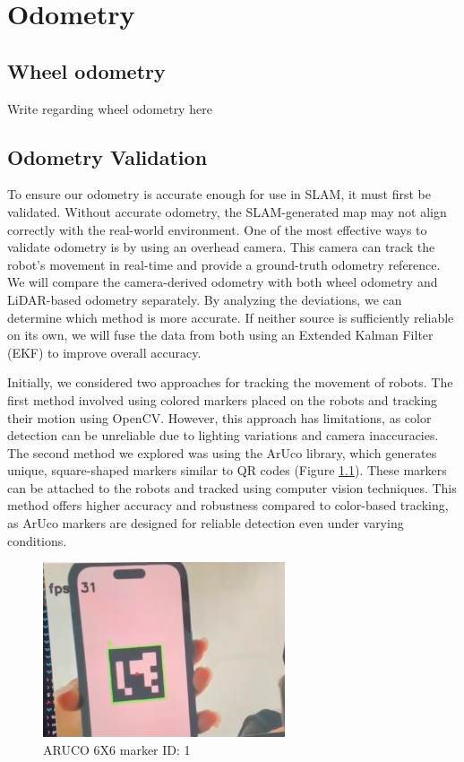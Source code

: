 \chapter{Odometry}

\section*{Wheel odometry}
{Write regarding wheel odometry here}

\section*{Odometry Validation}
To ensure our odometry is accurate enough for use in SLAM, it must first be validated. Without accurate odometry, the SLAM-generated map may not align correctly with the real-world environment. One of the most effective ways to validate odometry is by using an overhead camera. This camera can track the robot’s movement in real-time and provide a ground-truth odometry reference. We will compare the camera-derived odometry with both wheel odometry and LiDAR-based odometry separately. By analyzing the deviations, we can determine which method is more accurate. If neither source is sufficiently reliable on its own, we will fuse the data from both using an Extended Kalman Filter (EKF) to improve overall accuracy.
\newline

Initially, we considered two approaches for tracking the movement of robots. The first method involved using colored markers placed on the robots and tracking their motion using OpenCV. However, this approach has limitations, as color detection can be unreliable due to lighting variations and camera inaccuracies. The second method we explored was using the ArUco library, which generates unique, square-shaped markers similar to QR codes (Figure \ref{fig:aruco-marker}). These markers can be attached to the robots and tracked using computer vision techniques. This method offers higher accuracy and robustness compared to color-based tracking, as ArUco markers are designed for reliable detection even under varying conditions.

\begin{figure}[H]
    \centering
    \includegraphics[width=0.3\linewidth]{assets/images/odometry/aruco.jpg}
    \caption{ARUCO 6X6 marker ID: 1}
    \label{fig:aruco-marker}
\end{figure}

